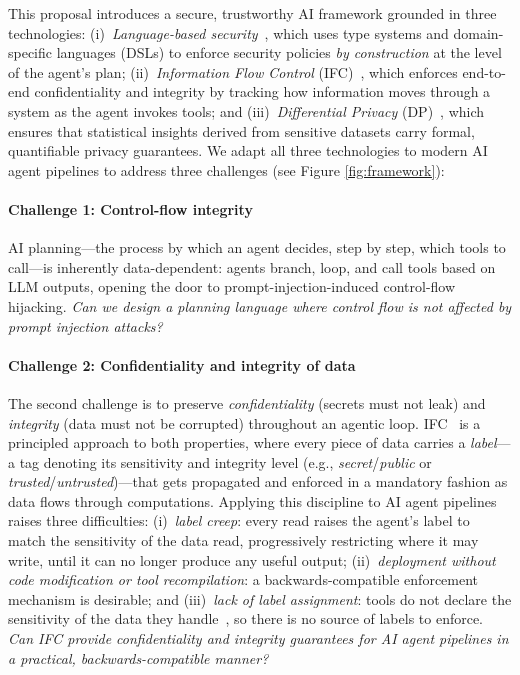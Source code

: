 \documentclass{kaw}
\begin{document}
This proposal introduces a secure, trustworthy AI framework grounded in three
technologies:
(i)~\emph{Language-based security}~\cite{Sabelfeld:Myers:JSAC}, which uses
type systems and domain-specific languages (DSLs) to enforce security policies \emph{by
construction} at the level of the agent's plan;
(ii)~\emph{Information Flow Control}
(IFC)~\cite{BellLaPadula:73,Sabelfeld:Myers:JSAC}, which enforces end-to-end
confidentiality and integrity by tracking how information moves through a
system as the agent invokes tools; and
(iii)~\emph{Differential Privacy} (DP)~\cite{Dwork:2006}, which ensures that
statistical insights derived from sensitive datasets carry formal,
quantifiable privacy guarantees.
%
We adapt all three technologies to modern AI agent pipelines 
to address three challenges (see Figure \ref{fig:framework}):

\paragraph{Challenge 1: Control-flow integrity} AI planning---the process by
which an agent decides, step by step, which tools to call---is inherently
data-dependent: agents branch, loop, and call tools based on LLM outputs,
opening the door to prompt-injection-induced control-flow hijacking.
%
%
%
\emph{Can we design a planning language where control flow is not affected by
prompt injection attacks?}
%


\paragraph{Challenge 2: Confidentiality and integrity of data}
%
The second challenge is to preserve \emph{confidentiality} (secrets must not
leak) and \emph{integrity} (data must not be
corrupted) throughout an 
agentic loop.
%
IFC~\cite{Sabelfeld:Myers:JSAC} is a principled
approach to both properties, where  
every piece of data carries a \emph{label}---a tag denoting its
sensitivity and integrity level (e.g., \emph{secret}/\emph{public} or
\emph{trusted}/\emph{untrusted})---that gets propagated and enforced
in a mandatory fashion as data flows through computations.
%
Applying this discipline to AI agent pipelines raises three difficulties: 
(i)~\emph{label creep}: every read raises the agent's label to match the
sensitivity of the data read, progressively restricting where it may write,
until it can no longer produce any useful output; 
%
(ii)~\emph{deployment without code modification or tool recompilation}: a
backwards-compatible enforcement mechanism is desirable; and
%
(iii)~\emph{lack of label assignment}: tools do not declare the sensitivity of
the data they handle~\cite{Costa:FIDES25,Zhao:ParasiticMCP26}, so there is no
source of labels to enforce.
%
\emph{Can IFC provide confidentiality and integrity guarantees for AI
agent pipelines in a practical, backwards-compatible manner?}
\end{document}
